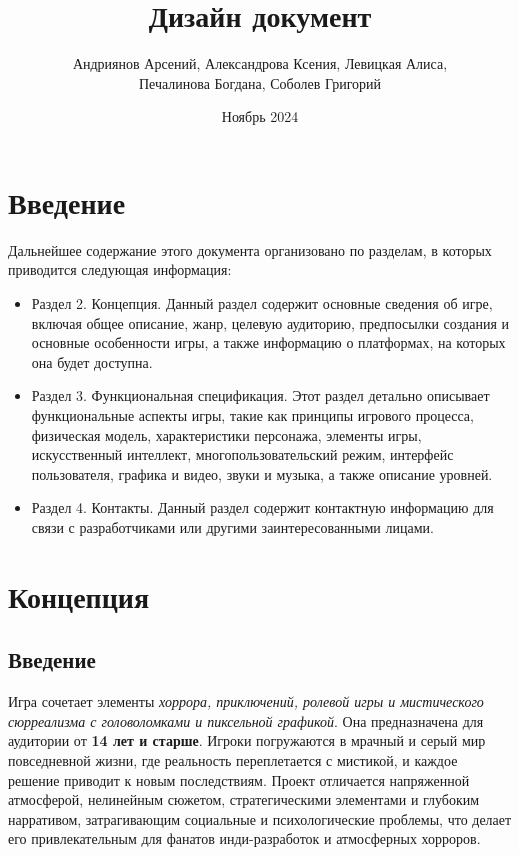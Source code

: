 \documentclass{article}
\title{Дизайн документ}
\author{Андриянов Арсений, Александрова Ксения, Левицкая Алиса, \\ Печалинова Богдана, Соболев Григорий}
\date{Ноябрь 2024}
\begin{document}
	
	\maketitle
	
	\tableofcontents
	
	\newpage
	\section{Введение}
	Дальнейшее содержание этого документа организовано по разделам, в которых приводится следующая информация:
	\begin{itemize}
		\item Раздел 2. Концепция. Данный раздел содержит основные сведения об игре, включая общее описание, жанр, целевую аудиторию, предпосылки создания и основные особенности игры, а также информацию о платформах, на которых она будет доступна.
		\item Раздел 3. Функциональная спецификация. Этот раздел детально описывает функциональные аспекты игры, такие как принципы игрового процесса, физическая модель, характеристики персонажа, элементы игры, искусственный интеллект, многопользовательский режим, интерфейс пользователя, графика и видео, звуки и музыка, а также описание уровней.
		\item Раздел 4. Контакты. Данный раздел содержит контактную информацию для связи с разработчиками или другими заинтересованными лицами.
	\end{itemize}
	
	\newpage
	\section{Концепция}
	
	\subsection{Введение}
	Игра сочетает элементы \textit{хоррора, приключений, ролевой игры и мистического сюрреализма с головоломками и пиксельной графикой}. Она предназначена для аудитории от \textbf{14 лет и старше}. Игроки погружаются в мрачный и серый мир повседневной жизни, где реальность переплетается с мистикой, и каждое решение приводит к новым последствиям. Проект отличается напряженной атмосферой, нелинейным сюжетом, стратегическими элементами и глубоким нарративом, затрагивающим социальные и психологические проблемы, что делает его привлекательным для фанатов инди-разработок и атмосферных хорроров.
	
\end{document}
